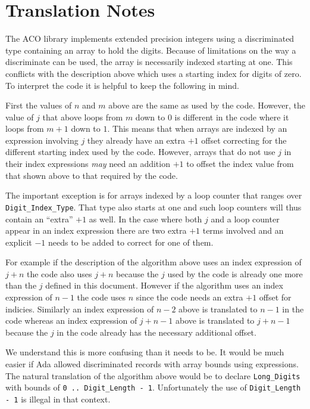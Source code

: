 \documentclass{article}
\begin{document}
\section{Translation Notes}

The ACO library implements extended precision integers using a discriminated type containing an
array to hold the digits. Because of limitations on the way a discriminate can be used, the
array is necessarily indexed starting at one. This conflicts with the description above which
uses a starting index for digits of zero. To interpret the code it is helpful to keep the
following in mind.

First the values of $n$ and $m$ above are the same as used by the code. However, the value of
$j$ that above loops from $m$ down to $0$ is different in the code where it loops from $m + 1$
down to $1$. This means that when arrays are indexed by an expression involving $j$ they already
have an extra $+1$ offset correcting for the different starting index used by the code. However,
arrays that do not use $j$ in their index expressions \emph{may} need an addition $+1$ to offset
the index value from that shown above to that required by the code.

The important exception is for arrays indexed by a loop counter that ranges over
\texttt{Digit\_Index\_Type}. That type also starts at one and such loop counters will thus
contain an ``extra'' $+1$ as well. In the case where both $j$ and a loop counter appear in an
index expression there are two extra $+1$ terms involved and an explicit $-1$ needs to be added
to correct for one of them.

For example if the description of the algorithm above uses an index expression of $j+n$ the code
also uses $j+n$ because the $j$ used by the code is already one more than the $j$ defined in
this document. However if the algorithm uses an index expression of $n-1$ the code uses $n$
since the code needs an extra $+1$ offset for indicies. Similarly an index expression of $n-2$
above is translated to $n-1$ in the code whereas an index expression of $j+n-1$ above is
translated to $j+n-1$ because the $j$ in the code already has the necessary additional offset.

We understand this is more confusing than it needs to be. It would be much easier if Ada allowed
discriminated records with array bounds using expressions. The natural translation of the
algorithm above would be to declare \texttt{Long\_Digits} with bounds of \texttt{0 ..
  Digit\_Length - 1}. Unfortunately the use of \texttt{Digit\_Length - 1} is illegal in that
context.



\end{document}
